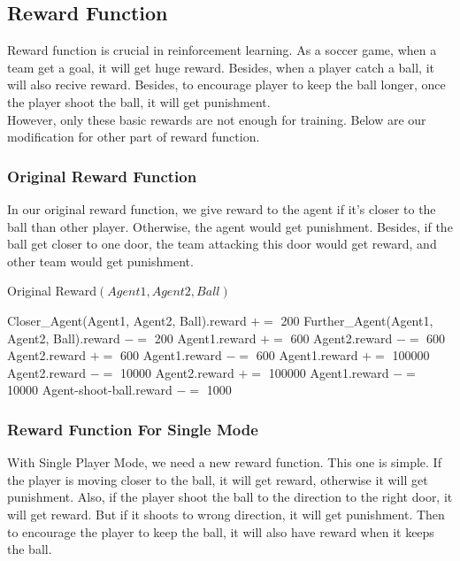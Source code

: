 \documentclass[12pt]{article}
\begin{document}
\subsection{Reward Function}
Reward function is crucial in reinforcement learning. As a soccer game, when a team get a goal, it will get huge reward. Besides, when a player catch a ball, it will also recive reward. Besides, to encourage player to keep the ball longer, once the player shoot the ball, it will get punishment.\\
However, only these basic rewards are not enough for training. Below are our modification for other part of reward function.

\subsubsection{Original Reward Function}
 In our original reward function, we give reward to the agent if it's closer to the ball than other player. Otherwise, the agent would get punishment. Besides, if the ball get closer to one door, the team attacking this door would get reward, and other team would get punishment.

\begin{algorithm}[!h]
	\caption{Original Reward$(Agent1,Agent2,Ball)$}
	\begin{algorithmic}
		\State Closer\_Agent(Agent1, Agent2, Ball).reward $+=$ 200
		\State Further\_Agent(Agent1, Agent2, Ball).reward $-=$ 200
		\State Agent1.reward $+=$ 600
		\State Agent2.reward $-=$ 600
		\EndIf
		\State Agent2.reward $+=$ 600
		\State Agent1.reward $-=$ 600
		\EndIf
		\State Agent1.reward $+=$ 100000
		\State Agent2.reward $-=$ 10000
		\EndIf
		\State Agent2.reward $+=$ 100000
		\State Agent1.reward $-=$ 10000
		\EndIf
		\State Agent-shoot-ball.reward $-=$ 1000
		\EndIf
	\end{algorithmic}
\end{algorithm}

\subsubsection{Reward Function For Single Mode}
With Single Player Mode, we need a new reward function. This one is simple. If the player is moving closer to the ball, it will get reward, otherwise it will get punishment. Also, if the player shoot the ball to the direction to the right door, it will get reward. But if it shoots to wrong direction, it will get punishment. Then to encourage the player to keep the ball, it will also have reward when it keeps the ball.
\end{document}
